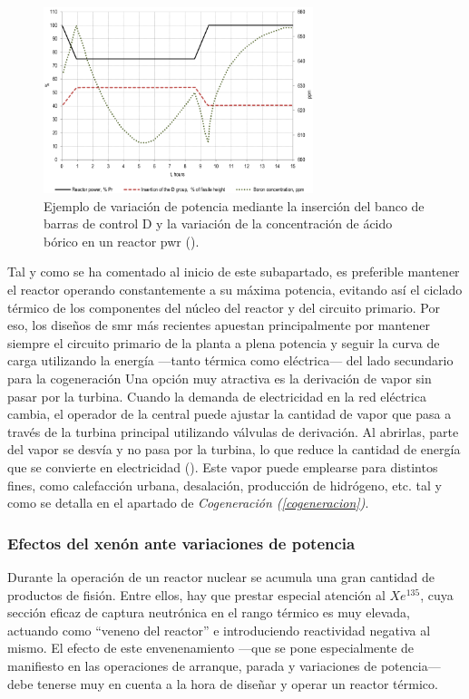\begin{figure}[h]
  \centering
  \includegraphics[width=0.7\textwidth]{content/figures/seguimiento_carga_barras_y_boro.png}
  \caption{Ejemplo de variación de potencia mediante la inserción del banco de barras de control D y la variación de la concentración de ácido bórico en un reactor \acrshort{pwr} (\cite{NEA_2011_load_following}).}
  \label{fig:seguimiento_carga_barras_y_boro}
\end{figure}

Tal y como se ha comentado al inicio de este subapartado, es preferible mantener el reactor operando constantemente a su máxima potencia, evitando así el ciclado térmico de los componentes del núcleo del reactor y del circuito primario. Por eso, los diseños de \acrshort{smr} más recientes apuestan principalmente por mantener siempre el circuito primario de la planta a plena potencia y seguir la curva de carga utilizando la energía ---tanto térmica como eléctrica--- del lado secundario para la cogeneración Una opción muy atractiva es la derivación de vapor sin pasar por la turbina. Cuando la demanda de electricidad en la red eléctrica cambia, el operador de la central puede ajustar la cantidad de vapor que pasa a través de la turbina principal utilizando válvulas de derivación. Al abrirlas, parte del vapor se desvía y no pasa por la turbina, lo que reduce la cantidad de energía que se convierte en electricidad (\cite{ANS_2019}). Este vapor puede emplearse para distintos fines, como calefacción urbana, desalación, producción de hidrógeno, etc. tal y como se detalla en el apartado de \textit{Cogeneración (\ref{cogeneracion})}. 

\subsubsection{Efectos del xenón ante variaciones de potencia}

Durante la operación de un reactor nuclear se acumula una gran cantidad de productos de fisión. Entre ellos, hay que prestar especial atención al $Xe^{135}$, cuya sección eficaz de captura neutrónica en el rango térmico es muy elevada, actuando como ``veneno del reactor'' e introduciendo reactividad negativa al mismo. El efecto de este envenenamiento ---que se pone especialmente de manifiesto en las operaciones de arranque, parada y variaciones de potencia--- debe tenerse muy en cuenta a la hora de diseñar y operar un reactor térmico.

